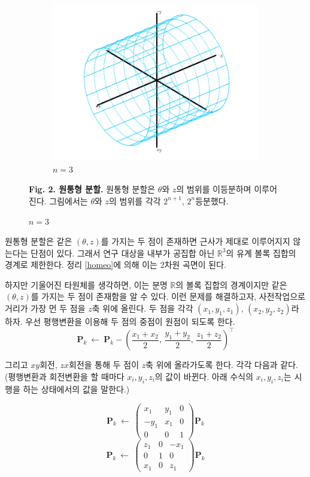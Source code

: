 \documentclass{Humantech_Paper_Awardfullpaper_hutech}
\begin{document}
\begin{figure}[h]
\begin{center}
		\begin{subfigure}{.15\textwidth}
			\includegraphics[width=\textwidth]{subdivision3}
			\caption{$n=3$}
		\end{subfigure}
	\end{center} 
	\raggedright \small \textbf{Fig. 2. 원통형 분할.} 원통형 분할은 $\theta$와 $z$의 범위를 이등분하며 이루어진다. 그림에서는 $\theta$와 $z$의 범위를 각각 $2^{n+1}$, $2^n$등분했다. 
\end{figure}

원통형 분할은 같은 $(\theta, z)$를 가지는 두 점이 존재하면 근사가 제대로 이루어지지 않는다는 단점이 있다. 그래서 연구 대상을 내부가 공집합 아닌 $\mathbb{R}^3$의 유계 볼록 집합의 경계로 제한한다. 정리 \ref{homeo}에 의해 이는 2차원 곡면이 된다. 

하지만 기울어진 타원체를 생각하면, 이는 분명 $\mathbb{R}$의 볼록 집합의 경계이지만 같은 $(\theta, z)$를 가지는 두 점이 존재함을 알 수 있다. 이런 문제를 해결하고자, 사전작업으로 거리가 가장 먼 두 점을 $z$축 위에 올린다. 두 점을 각각 $(x_1, y_1, z_1), \, (x_2, y_2, z_2)$라 하자. 우선 평행변환을 이용해 두 점의 중점이 원점이 되도록 한다. 
$$ \mathbf{P}_k \ \leftarrow \ \mathbf{P}_k - \left( \frac{x_1 + x_2}2, \, \frac{y_1 + y_2}2, \, \frac{z_1 + z_2}2 \right)^\intercal $$
	
그리고 $xy$회전, $zx$회전을 통해 두 점이 $z$축 위에 올라가도록 한다. 각각 다음과 같다. (평행변환과 회전변환을 할 때마다 $x_i, y_i, z_i$의 값이 바뀐다. 아래 수식의 $x_i, y_i, z_i$는 시행을 하는 상태에서의 값을 말한다.)

$$ \mathbf{P}_k\ \leftarrow\ \begin{pmatrix}
	x_1 & y_1 & 0 \\ -y_1 & x_1 & 0 \\ 0 & 0 & 1
\end{pmatrix} \mathbf{P}_k $$
$$ \mathbf{P}_k\ \leftarrow\ \begin{pmatrix}
	z_1 & 0 & -x_1 \\ 0 & 1 & 0 \\ x_1 & 0 & z_1
\end{pmatrix} \mathbf{P}_k $$
\end{document}
